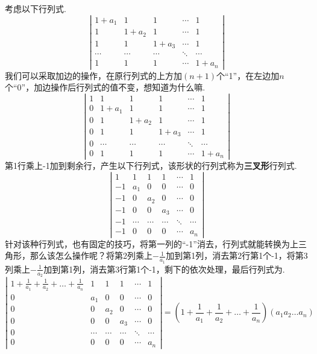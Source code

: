 \documentclass[12pt, a4paper, oneside]{ctexbook}
\begin{document}
考虑以下行列式. 
$$\left | \begin{matrix}
    1+a_1 & 1 & 1 & \cdots & 1 \\
    1 & 1+a_2 & 1 & \cdots & 1 \\
    1 & 1 & 1+a_3 & \cdots & 1 \\
    \cdots & \cdots & \cdots & \ddots & \cdots \\
    1 & 1 & 1 & \cdots & 1+a_n
\end{matrix} \right |$$
我们可以采取加边的操作，在原行列式的上方加$(n+1)$个``1''，在左边加$n$个``0''，加边操作后行列式的值不变，想知道为什么嘛. 
$$\left | \begin{matrix}
    1 & 1 & 1 & 1 & \cdots & 1 \\
    0 & 1+a_1 & 1 & 1 & \cdots & 1 \\
    0 & 1 & 1+a_2 & 1 & \cdots & 1 \\
    0 & 1 & 1 & 1+a_3 & \cdots & 1 \\
    0 & \cdots & \cdots & \cdots & \ddots & \cdots \\
    0 & 1 & 1 & 1 & \cdots & 1+a_n
\end{matrix} \right |$$
第1行乘上-1加到剩余行，产生以下行列式，该形状的行列式称为\textbf{三叉形}行列式. 
$$\left | \begin{matrix}
    1 & 1 & 1 & 1 & \cdots & 1 \\
    -1 & a_1 & 0 & 0 & \cdots & 0 \\
    -1 & 0 & a_2 & 0 & \cdots & 0 \\
    -1 & 0 & 0 & a_3 & \cdots & 0 \\
    -1 & \cdots & \cdots & \cdots & \ddots & \cdots \\
    -1 & 0 & 0 & 0 & \cdots & a_n
\end{matrix} \right |$$
针对该种行列式，也有固定的技巧，将第一列的``-1''消去，行列式就能转换为上三角形，那么该怎么操作呢？将第2列乘上$-\frac{1}{a_1}$加到第1列，消去第2行第1个-1，将第3列乘上$-\frac{1}{a_2}$加到第1列，消去第3行第1个-1，剩下的依次处理，最后行列式为.
$$\left | \begin{matrix}
    1 + \frac{1}{a_1} + \frac{1}{a_2} + \dots + \frac{1}{a_n} & 1 & 1 & 1 & \cdots & 1 \\
    0 & a_1 & 0 & 0 & \cdots & 0 \\
    0 & 0 & a_2 & 0 & \cdots & 0 \\
    0 & 0 & 0 & a_3 & \cdots & 0 \\
    0 & \cdots & \cdots & \cdots & \ddots & \cdots \\
    0 & 0 & 0 & 0 & \cdots & a_n
\end{matrix} \right | = (1 + \frac{1}{a_1} + \frac{1}{a_2} + \dots + \frac{1}{a_n})(a_1a_2 \dots a_n)$$
\end{document}

